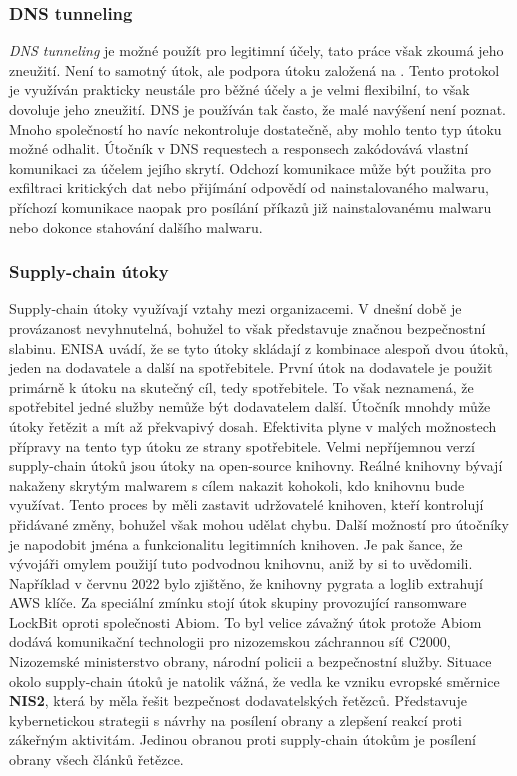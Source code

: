 \subsubsection{DNS tunneling}
\textit{DNS tunneling} je možné použít pro legitimní účely, tato práce však zkoumá jeho zneužití.
Není to samotný útok, ale podpora útoku založená na .
Tento protokol je využíván prakticky neustále pro běžné účely a je velmi flexibilní, to však dovoluje jeho zneužití.
\ac{DNS} je používán tak často, že malé navýšení není poznat.
Mnoho společností ho navíc nekontroluje dostatečně, aby mohlo tento typ útoku možné odhalit.
Útočník v \ac{DNS} requestech a responsech zakódovává vlastní komunikaci za účelem jejího skrytí.
Odchozí komunikace může být použita pro exfiltraci kritických dat nebo přijímání odpovědí od nainstalovaného malwaru, příchozí komunikace naopak pro posílání příkazů již nainstalovanému malwaru nebo dokonce stahování dalšího malwaru.\cite{cisco_most_common_attack, bright_sec_dns_tunneling}

\subsubsection{Supply-chain útoky}
Supply-chain útoky využívají vztahy mezi organizacemi.
V dnešní době je provázanost nevyhnutelná, bohužel to však představuje značnou bezpečnostní slabinu.
\ac{ENISA} uvádí, že se tyto útoky skládají z kombinace alespoň dvou útoků, jeden na dodavatele a další na spotřebitele.
První útok na dodavatele je použit primárně k útoku na skutečný cíl, tedy spotřebitele.
To však neznamená, že spotřebitel jedné služby nemůže být dodavatelem další.
Útočník mnohdy může útoky řetězit a mít až překvapivý dosah.
Efektivita plyne v malých možnostech přípravy na tento typ útoku ze strany spotřebitele.
Velmi nepříjemnou verzí supply-chain útoků jsou útoky na open-source knihovny.
Reálné knihovny bývají nakaženy skrytým malwarem s cílem nakazit kohokoli, kdo knihovnu bude využívat.
Tento proces by měli zastavit udržovatelé knihoven, kteří kontrolují přidávané změny, bohužel však mohou udělat chybu.
Další možností pro útočníky je napodobit jména a funkcionalitu legitimních knihoven.
Je pak šance, že vývojáři omylem použijí tuto podvodnou knihovnu, aniž by si to uvědomili.
Například v červnu 2022 bylo zjištěno, že knihovny pygrata a loglib extrahují AWS klíče.
Za speciální zmínku stojí útok skupiny provozující ransomware LockBit oproti společnosti Abiom.
To byl velice závažný útok protože Abiom dodává komunikační technologii pro nizozemskou záchrannou síť C2000, Nizozemské ministerstvo obrany, národní policii a bezpečnostní služby.
Situace okolo supply-chain útoků je natolik vážná, že vedla ke vzniku evropské směrnice \textbf{NIS2}, která by měla řešit bezpečnost dodavatelských řetězců.
Představuje kybernetickou strategii s návrhy na posílení obrany a zlepšení reakcí proti zákeřným aktivitám.
Jedinou obranou proti supply-chain útokům je posílení obrany všech článků řetězce.\cite{Enisa_thread_landscape}


